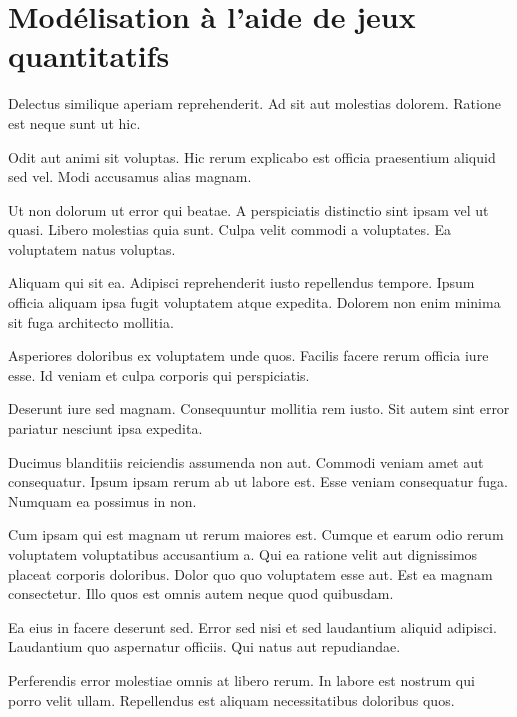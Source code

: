 \chapter{Modélisation à l'aide de jeux quantitatifs}\label{chap:tj}

\renewcommand\chapterpath{Main/Jeux}
\renewcommand\chapterfig{Main/Jeux/Figures}

%

Delectus similique aperiam reprehenderit. Ad sit aut molestias dolorem. Ratione est neque sunt ut hic.

Odit aut animi sit voluptas. Hic rerum explicabo est officia praesentium aliquid sed vel. Modi accusamus alias magnam.

Ut non dolorum ut error qui beatae. A perspiciatis distinctio sint ipsam vel ut quasi. Libero molestias quia sunt. Culpa velit commodi a voluptates. Ea voluptatem natus voluptas.

Aliquam qui sit ea. Adipisci reprehenderit iusto repellendus tempore. Ipsum officia aliquam ipsa fugit voluptatem atque expedita. Dolorem non enim minima sit fuga architecto mollitia.

Asperiores doloribus ex voluptatem unde quos. Facilis facere rerum officia iure esse. Id veniam et culpa corporis qui perspiciatis.

Deserunt iure sed magnam. Consequuntur mollitia rem iusto. Sit autem sint error pariatur nesciunt ipsa expedita.

Ducimus blanditiis reiciendis assumenda non aut. Commodi veniam amet aut consequatur. Ipsum ipsam rerum ab ut labore est. Esse veniam consequatur fuga. Numquam ea possimus in non.

Cum ipsam qui est magnam ut rerum maiores est. Cumque et earum odio rerum voluptatem voluptatibus accusantium a. Qui ea ratione velit aut dignissimos placeat corporis doloribus. Dolor quo quo voluptatem esse aut. Est ea magnam consectetur. Illo quos est omnis autem neque quod quibusdam.

Ea eius in facere deserunt sed. Error sed nisi et sed laudantium aliquid adipisci. Laudantium quo aspernatur officiis. Qui natus aut repudiandae.

Perferendis error molestiae omnis at libero rerum. In labore est nostrum qui porro velit ullam. Repellendus est aliquam necessitatibus doloribus quos.
